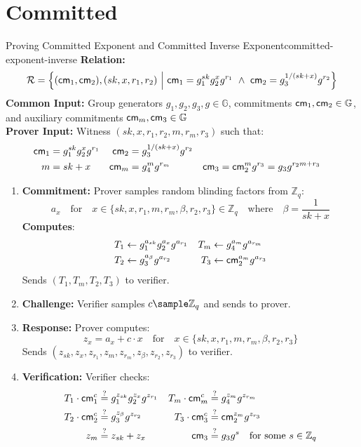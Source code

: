\newpage
\section{Committed}

\begin{protocol}{Proving Committed Exponent and Committed Inverse Exponent}{committed-exponent-inverse}\label{pok-committed-exponent-inverse}
\textbf{Relation: }
\[
\mathcal{R} = \left\{ (\mathsf{cm}_1, \mathsf{cm}_2), (sk, x, r_1, r_2) \ \middle|\ \mathsf{cm}_1 = g_1^{sk} g_2^{x} g^{r_1} \ \land\ \mathsf{cm}_2 = g_3^{1/(sk + x)} g^{r_2} \right\}
\]
\textbf{Common Input:} Group generators $g_1, g_2, g_3, g \in \mathbb{G}$, commitments $\mathsf{cm}_1, \mathsf{cm}_2 \in \mathbb{G}$, and auxiliary commitments $\mathsf{cm}_m, \mathsf{cm}_3 \in \mathbb{G}$\\
\textbf{Prover Input:} Witness $(sk, x, r_1, r_2, m, r_m, r_3)$ such that:
    \begin{align*}
        \mathsf{cm}_1 &= g_1^{sk} g_2^{x} g^{r_1} & \mathsf{cm}_2 &= g_3^{1/(sk + x)} g^{r_2} \\
        m &= sk + x & \mathsf{cm}_m &= g_4^{m} g^{r_m} & \mathsf{cm}_3 &= \mathsf{cm}_2^{m} g^{r_3} = g_3 g^{r_2 m + r_3}
    \end{align*}
\begin{enumerate}
    \item \textbf{Commitment:} Prover samples random blinding factors from $\mathbb{Z}_q$:
       \[
        a_x \quad \text{for} \quad x \in \{ sk, x, r_1, m, r_m, \beta, r_2, r_3 \} \in \mathbb{Z}_q \quad \text{where} \quad \beta = \frac{1}{sk + x}
       \]
    \textbf{Computes}:
    \begin{align*}
        T_1 &\gets g_1^{a_{sk}} g_2^{a_x} g^{a_{r_1}} & T_m &\gets g_4^{a_m} g^{a_{r_m}} \\
        T_2 &\gets g_3^{a_\beta} g^{a_{r_2}} & T_3 &\gets \mathsf{cm}_2^{a_m} g^{a_{r_3}}
    \end{align*}
    Sends $(T_1, T_m, T_2, T_3)$ to verifier.
    
    \item \textbf{Challenge:} Verifier samples $c \sample \mathbb{Z}_q$ and sends to prover.
    
    \item \textbf{Response:} Prover computes:
    \[
    z_x = a_x + c \cdot x \quad \text{for} \quad x \in \{ sk, x, r_1, m, r_m, \beta, r_2, r_3 \}
    \]
    Sends $(z_{sk}, z_x, z_{r_1}, z_m, z_{r_m}, z_\beta, z_{r_2}, z_{r_3})$ to verifier.
    
    \item \textbf{Verification:} Verifier checks:
    \begin{align*}
        T_1 \cdot \mathsf{cm}_1^c &\stackrel{?}{=} g_1^{z_{sk}} g_2^{z_x} g^{z_{r_1}} &
        T_m \cdot \mathsf{cm}_m^c &\stackrel{?}{=} g_4^{z_m} g^{z_{r_m}} \\
        T_2 \cdot \mathsf{cm}_2^c &\stackrel{?}{=} g_3^{z_\beta} g^{z_{r_2}} &
        T_3 \cdot \mathsf{cm}_3^c &\stackrel{?}{=} \mathsf{cm}_2^{z_m} g^{z_{r_3}} \\
        z_m &\stackrel{?}{=} z_{sk} + z_x &
        \mathsf{cm}_3 &\stackrel{?}{=} g_3 g^{s} \quad \text{for some } s \in \mathbb{Z}_q
    \end{align*}
\end{enumerate}
\end{protocol}
